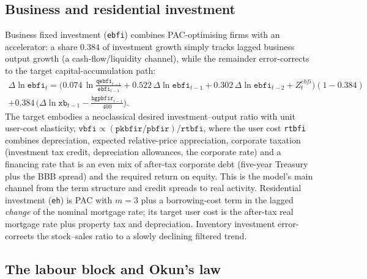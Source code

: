 \subsection{Business and residential investment}
\label{sec:investment}

Business fixed investment (\texttt{ebfi}) combines PAC-optimising firms with an accelerator: a share $0.384$ of investment growth simply tracks lagged business output growth (a cash-flow/liquidity channel), while the remainder error-corrects to the target capital-accumulation path:
\begin{multline}
\Delta\ln \texttt{ebfi}_t = \big(0.074\,\ln\tfrac{\texttt{qebfi}_{t-1}}{\texttt{ebfi}_{t-1}} + 0.522\,\Delta\ln \texttt{ebfi}_{t-1} + 0.302\,\Delta\ln \texttt{ebfi}_{t-2} + Z^{ebfi}_t\big)(1-0.384) \\
 + 0.384\,\big(\Delta\ln \texttt{xb}_{t-1}-\tfrac{\texttt{hgpbfir}_{t-1}}{400}\big).
\label{eq:ebfi}
\end{multline}
The target embodies a neoclassical desired investment--output ratio with unit user-cost elasticity, $\texttt{vbfi}\propto (\texttt{pkbfir}/\texttt{pbfir})/\texttt{rtbfi}$, where the user cost \texttt{rtbfi} combines depreciation, expected relative-price appreciation, corporate taxation (investment tax credit, depreciation allowances, the corporate rate) and a financing rate that is an even mix of after-tax corporate debt (five-year Treasury plus the BBB spread) and the required return on equity. This is the model's main channel from the term structure and credit spreads to real activity. Residential investment (\texttt{eh}) is PAC with $m=3$ plus a borrowing-cost term in the lagged \emph{change} of the nominal mortgage rate; its target user cost is the after-tax real mortgage rate plus property tax and depreciation. Inventory investment error-corrects the stock--sales ratio to a slowly declining filtered trend.

\subsection{The labour block and Okun's law}
\label{sec:labour}

